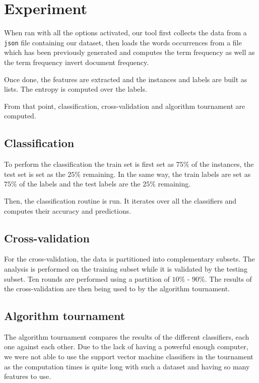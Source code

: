 \section{Experiment}

When ran with all the options activated, our tool first collects the data from 
a \verb|json| file containing our dataset, then loads the words occurrences 
from a file which has been previously generated and computes the term frequency 
as well as the term frequency invert document frequency.

Once done, the features are extracted and the instances and labels are built as 
lists. The entropy is computed over the labels.

From that point, classification, cross-validation and algorithm tournament are 
computed.

\subsection{Classification}

To perform the classification the train set is first set as $75\%$ of the 
instances, the test set is set as the $25\%$ remaining.
In the same way, the train labels are set as $75\%$ of the labels and the test 
labels are the $25\%$ remaining.

Then, the classification routine is run. It iterates over all the classifiers 
and computes their accuracy and predictions.

\subsection{Cross-validation}

For the cross-validation, the data is partitioned into complementary subsets.
The analysis is performed on the training subset while it is validated by the 
testing subset. Ten rounds are performed using a partition of $10\%$ - $90\%$.
The results of the cross-validation are then being used to by the 
algorithm tournament.

\subsection{Algorithm tournament}

The algorithm tournament compares the results of the different classifiers, 
each one against each other.
Due to the lack of having a powerful enough computer, we were not able to use 
the support vector machine classifiers in the tournament as the computation 
times is quite long with such a dataset and having so many features to use.
